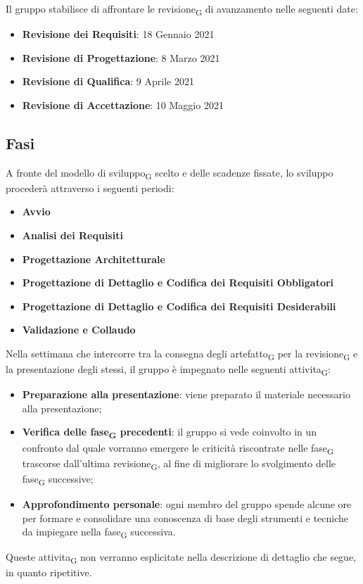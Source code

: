 Il gruppo stabilisce di affrontare le revisione\textsubscript{G} di avanzamento nelle seguenti date:
\begin{itemize}
	\item \textbf{Revisione dei Requisiti}: 18 Gennaio 2021
	\item \textbf{Revisione di Progettazione}: 8 Marzo 2021 
	\item \textbf{Revisione di Qualifica}: 9 Aprile 2021
	\item \textbf{Revisione di Accettazione}: 10 Maggio 2021	
\end{itemize}





\subsection{Fasi}

A fronte del modello di sviluppo\textsubscript{G} scelto e delle scadenze fissate, lo sviluppo procederà attraverso i seguenti periodi:
\begin{itemize}
	\item \textbf{Avvio}
	\item \textbf{Analisi dei Requisiti}
	\item \textbf{Progettazione Architetturale}
	\item \textbf{Progettazione di Dettaglio e Codifica dei Requisiti Obbligatori}
	\item \textbf{Progettazione di Dettaglio e Codifica dei Requisiti Desiderabili}
	\item \textbf{Validazione e Collaudo}
\end{itemize}


Nella settimana che intercorre tra la consegna degli artefatto\textsubscript{G} per la revisione\textsubscript{G} e la presentazione degli stessi, il gruppo è impegnato nelle seguenti attivita\textsubscript{G}: 
\begin{itemize}
	\item \textbf{Preparazione alla presentazione}: viene preparato il materiale necessario alla presentazione;
	\item \textbf{Verifica delle fase\textsubscript{G} precedenti}: il gruppo si vede coinvolto in un confronto dal quale vorranno emergere le criticità riscontrate nelle fase\textsubscript{G} trascorse dall'ultima revisione\textsubscript{G}, al fine di migliorare lo svolgimento delle fase\textsubscript{G} successive;
	\item \textbf{Approfondimento personale}: ogni membro del gruppo spende alcune ore per formare e consolidare una conoscenza di base degli strumenti e tecniche da impiegare nella fase\textsubscript{G} successiva.
\end{itemize}
Queste attivita\textsubscript{G} non verranno esplicitate nella descrizione di dettaglio che segue, in quanto ripetitive.




